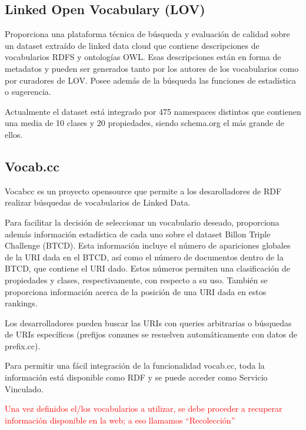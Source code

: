 \subsection{Linked Open Vocabulary (LOV)}

\cite{Vandenbussche2012} Proporciona una plataforma técnica de búsqueda y evaluación de calidad sobre un dataset extraído de linked data cloud que contiene descripciones de vocabularios RDFS 
y ontologías OWL. Esas descripciones están en forma de metadatos y pueden ser generados tanto por los autores de los vocabularios como por curadores de LOV.
Posee además de la búsqueda las funciones de estadística o sugerencia.

Actualmente el dataset está integrado por 475 namespaces distintos que contienen una media de 10 clases y 20 propiedades, siendo schema.org el más grande de ellos.

\subsection{Vocab.cc}
Vocabcc es un proyecto opensource que permite a los desarolladores de RDF realizar búsquedas de vocabularios de Linked Data.

Para facilitar la decisión de seleccionar un vocabulario deseado, proporciona además información estadística de cada uno sobre el dataset Billon Triple Challenge (BTCD)\cite{btc-2012}. 
 Esta información incluye el número de apariciones globales de la URI dada en el BTCD, así como el número de documentos dentro de la BTCD, que contiene el URI dado. Estos números permiten una clasificación de propiedades y clases, respectivamente, con respecto a su uso. También se proporciona información acerca de la posición de una URI dada en estos rankings.

Los desarrolladores pueden buscar las URIs con queries arbitrarias o búsquedas de URIs específicos (prefijos comunes se resuelven automáticamente con datos de prefix.cc).

Para permitir una fácil integración de la funcionalidad vocab.cc, toda la información está disponible como RDF y se puede acceder como Servicio Vinculado.

\begin{framed}
\textcolor{red}{Una vez definidos el/los vocabularios a utilizar, se debe proceder a recuperar información disponible en la web; a eso llamamos ``Recolección''}
\end{framed}

